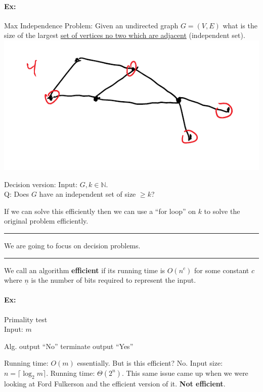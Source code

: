 \documentclass[12 pt]{article}
\begin{document}
          \paragraph{Ex: }Max Independence Problem: Given an
          undirected graph $G=(V,E)$ what is the size of the largest
          \underline{set of vertices no two which are adjacent}
          (independent set).
          \\ \includegraphics[width=.9\textwidth]{i115.pdf}

          Decision version: Input: $G, k \in \mathbb{N}$.
          \\ Q: Does $G$ have an independent set of size $\geq k$?

          If we can solve this efficiently then we can use a ``for
          loop'' on $k$ to solve the original problem efficiently.
          \\ \noindent \rule{\textwidth}{0.5pt}
          We are going to focus on decision problems.
          \\ \noindent \rule{\textwidth}{0.5pt}
          We call an algorithm \textbf{efficient} if its running time is
          $O(n^c)$ for some constant $c$ where $\underline{n}$ is the
          number of bits required to represent the input.
          \paragraph{Ex:} Primality test
          \\ Input: $m$
          \begin{algorithmic}
            \State Alg.
                 output ``No''
                \State terminate
                \EndIf
            \EndFor
            \State output ``Yes''
          \end{algorithmic}
          Running time: $O(m)$ essentially. But is this efficient?
          No. Input size: $n = \lceil \log_2 m\rceil$. Running time:
          $\Theta(2^n)$. This same issue came up when we were looking
          at Ford Fulkerson and the efficient version of
          it. \textbf{Not efficient}.
\end{document}
